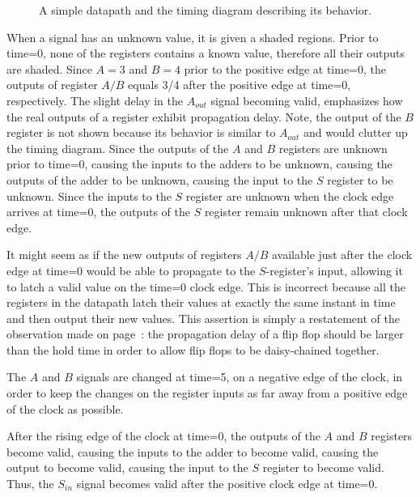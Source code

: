 \begin{figure}[ht]

\caption{A simple datapath and the timing diagram describing its
behavior.}
\label{fig:sequentialBBsimple}

\end{figure}

When a signal has an unknown value, it is given a shaded regions.  Prior to 
time=0, none of the registers contains a known value, therefore all 
their outputs are shaded.  Since $A=3$ and $B=4$ prior to the 
positive edge at time=0, the outputs of register $A/B$ equals 3/4 
after the positive edge at time=0, respectively. The slight delay 
in the $A_{out}$ signal becoming valid, emphasizes how the 
real outputs of a register exhibit propagation delay. Note, the output of the
$B$ register is not shown because its behavior is similar to $A_{out}$ and
would clutter up the timing diagram.  Since the outputs of the $A$ and $B$ 
registers are unknown prior to time=0, causing the 
inputs to the adders to be unknown, causing the outputs of the 
adder to be unknown, causing the input to the $S$ register to be 
unknown.  Since the inputs to the $S$ 
register are unknown when the clock edge arrives at time=0, the outputs of the
$S$ register remain unknown after that clock edge.  

It might seem as if the new outputs of registers $A/B$ available 
just after the clock edge at time=0 would be able to propagate 
to the $S$-register's input, allowing it to latch a valid value 
on the time=0 clock edge.  This is incorrect because all the
registers in the datapath latch their values at exactly the same 
instant in time and then output their new values.  This assertion 
is simply a restatement of the observation made on 
page~\pageref{page:FFdelay}: the propagation delay of a flip flop 
should be larger than the hold time in order to allow flip flops 
to be daisy-chained together.

The $A$ and $B$ signals are changed at time=5, on a negative edge 
of the clock, in order to keep the changes on the register inputs 
as far away from a positive edge of the clock as possible.

After the rising edge of the clock at time=0, the outputs of the 
$A$ and $B$ registers become valid, causing the inputs to the adder 
to become valid, causing the output to become valid, causing the 
input to the $S$ register to become valid.  Thus, the $S_{in}$ 
signal becomes valid after the positive clock edge at time=0.


